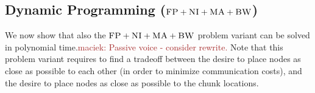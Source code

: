 \documentclass[9pt]{sigcomm-alternate}
\newcommand{\maciek}[1]{\textcolor{brown}{maciek: #1}}
\newcommand{\VirtualNode}{v}
\newcommand{\achunk}{\ensuremath{c}}
\newcommand{\CC}{\textsc{NI}}
\newcommand{\FP}{\textsc{FP}}
\newcommand{\RS}{\textsc{RS}}
\newcommand{\BW}{\textsc{BW}}
\newcommand{\MA}{\textsc{MA}}
\begin{document}
%
%
%
%
%


\subsection{Dynamic Programming ($\FP+\CC+\MA+\BW$)}\label{ssec:dyn}

We now show that also the $\FP+\CC+\MA+\BW$ problem variant can be solved
in polynomial time.\maciek{Passive voice - consider rewrite.}
Note that this problem variant requires to find a
tradeoff between the desire to place nodes as close as possible to each other
(in order to minimize communication costs), and the desire to place nodes
as close as possible to
the chunk locations.
\end{document}
